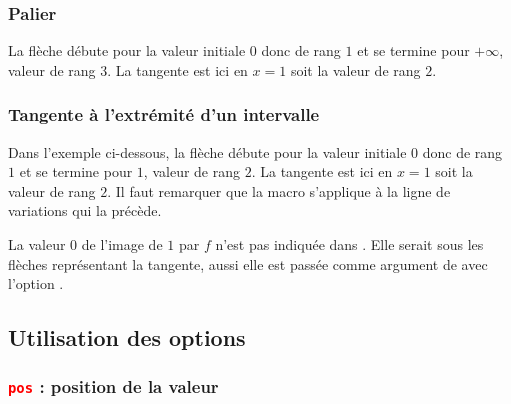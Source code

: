 \subsubsection{Palier}
La flèche débute pour la valeur initiale $0$ donc de rang $1$ et se termine pour $+\infty$, valeur de rang $3$.  La tangente est ici en $x=1$ soit la valeur de rang $2$.

\begin{tkzexample}[vbox]
\end{tkzexample}  

\subsubsection{Tangente à l'extrémité d'un intervalle}
Dans l'exemple ci-dessous, la flèche débute pour la valeur initiale $0$ donc de rang $1$ et se termine pour $1$, valeur de rang $2$. La tangente est ici en $x=1$ soit la valeur de rang $2$. Il faut remarquer que la macro  s'applique à la ligne de variations qui la précède.

La valeur $0$ de l'image de $1$ par $f$ n'est pas indiquée dans . Elle serait sous les flèches représentant la tangente, aussi elle est passée comme argument de  avec l'option .

\begin{tkzexample}[vbox]
\end{tkzexample}  

\subsection{Utilisation des options}

\subsubsection{\texttt{\textcolor{red}{pos}} : position de la valeur} 

